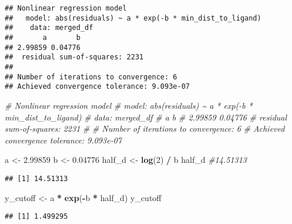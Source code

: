 \documentclass[
]{article}
\newenvironment{Shaded}{\begin{snugshade}}{\end{snugshade}}
\newcommand{\CommentTok}[1]{\textcolor[rgb]{0.56,0.35,0.01}{\textit{#1}}}
\newcommand{\DecValTok}[1]{\textcolor[rgb]{0.00,0.00,0.81}{#1}}
\newcommand{\FloatTok}[1]{\textcolor[rgb]{0.00,0.00,0.81}{#1}}
\newcommand{\FunctionTok}[1]{\textcolor[rgb]{0.13,0.29,0.53}{\textbf{#1}}}
\newcommand{\NormalTok}[1]{#1}
\newcommand{\OtherTok}[1]{\textcolor[rgb]{0.56,0.35,0.01}{#1}}
\newcommand{\SpecialCharTok}[1]{\textcolor[rgb]{0.81,0.36,0.00}{\textbf{#1}}}
\begin{document}
\begin{verbatim}
## Nonlinear regression model
##   model: abs(residuals) ~ a * exp(-b * min_dist_to_ligand)
##    data: merged_df
##       a       b 
## 2.99859 0.04776 
##  residual sum-of-squares: 2231
## 
## Number of iterations to convergence: 6 
## Achieved convergence tolerance: 9.093e-07
\end{verbatim}

\begin{Shaded}
\begin{Highlighting}[]
\CommentTok{\# Nonlinear regression model}
\CommentTok{\#   model: abs(residuals) \textasciitilde{} a * exp({-}b * min\_dist\_to\_ligand)}
\CommentTok{\#    data: merged\_df}
\CommentTok{\#       a       b }
\CommentTok{\# 2.99859 0.04776 }
\CommentTok{\#  residual sum{-}of{-}squares: 2231}
\CommentTok{\# }
\CommentTok{\# Number of iterations to convergence: 6 }
\CommentTok{\# Achieved convergence tolerance: 9.093e{-}07}
\end{Highlighting}
\end{Shaded}

\begin{Shaded}
\begin{Highlighting}[]
\NormalTok{a }\OtherTok{\textless{}{-}} \FloatTok{2.99859}
\NormalTok{b }\OtherTok{\textless{}{-}} \FloatTok{0.04776}  
\NormalTok{half\_d }\OtherTok{\textless{}{-}} \FunctionTok{log}\NormalTok{(}\DecValTok{2}\NormalTok{) }\SpecialCharTok{/}\NormalTok{ b  }
\NormalTok{half\_d }\CommentTok{\#14.51313}
\end{Highlighting}
\end{Shaded}

\begin{verbatim}
## [1] 14.51313
\end{verbatim}

\begin{Shaded}
\begin{Highlighting}[]
\NormalTok{y\_cutoff }\OtherTok{\textless{}{-}}\NormalTok{ a  }\SpecialCharTok{*} \FunctionTok{exp}\NormalTok{(}\SpecialCharTok{{-}}\NormalTok{b    }\SpecialCharTok{*}\NormalTok{ half\_d)}
\NormalTok{y\_cutoff}
\end{Highlighting}
\end{Shaded}

\begin{verbatim}
## [1] 1.499295
\end{verbatim}
\end{document}
